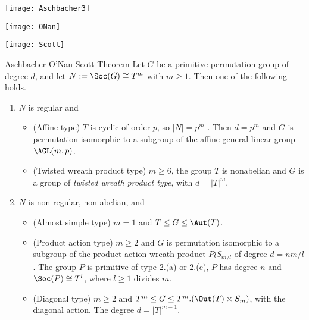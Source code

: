 \begin{frame}[fragile,label=OSTheorem]{}
\vskip2mm
\hskip3mm
\texttt{[image: Aschbacher3]}
\begin{center}
\texttt{[image: ONan]}
\end{center}
\hfill    
\texttt{[image: Scott]}

\end{frame}


\begin{frame}[fragile,label=OSTheorem]{Aschbacher-O'Nan-Scott Theorem}
Let $G$ be a primitive permutation
group of degree $d$, and let $N := \Soc(G) \cong T^m$ with $m \geq 1$. 
Then one of the following holds.
\vskip2mm
\begin{enumerate}
\item 
$N$ is regular and
  \begin{itemize}
  \item 
  \alert{(Affine type)} $T$ is cyclic of order $p$, so $|N| = p^m$ . Then 
$d = p^m$ and $G$ is permutation isomorphic to a subgroup of the affine
general linear group $\AGL(m,p)$.
\vskip2mm
\item \alert{(Twisted wreath product type)} $m \geq 6$, the group $T$ is 
  nonabelian and $G$ is a group of \emph{twisted wreath product type}, with
  $d = |T|^m$.
  \end{itemize}
\vskip2mm
\item $N$ is non-regular, non-abelian, and
  \begin{itemize}
  \item 
\alert{(Almost simple type)} $m = 1$ and $T \leq G \leq \Aut(T)$.
\vskip2mm
\item \alert{(Product action type)} $m \geq 2$ and $G$ is permutation isomorphic to a
subgroup of the product action wreath product $P \wr S_{m/l}$ of degree
$d = nm/l$. The group $P$ is primitive of type 2.(a) or 2.(c), $P$ has
degree $n$ and $\Soc(P) \cong T^l$, where $l \geq 1$ divides $m$.
\vskip2mm
\item 
\alert{(Diagonal type)} $m \geq 2$ and $T^m \leq G \leq T^m . (\Out(T ) \times S_m)$, with
the diagonal action. The degree $d = |T|^{m-1}$.
  \end{itemize}
\end{enumerate}
\end{frame}


